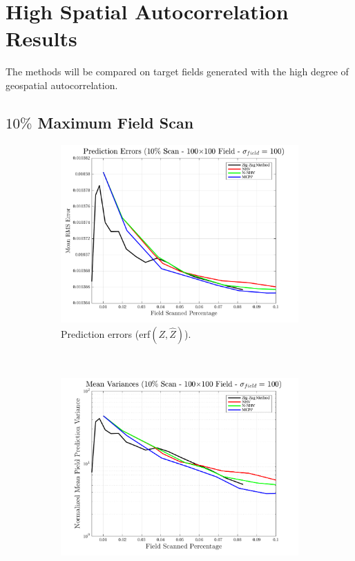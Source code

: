 \section{High Spatial Autocorrelation Results}
The methods will be compared on target fields generated with the high degree of geospatial autocorrelation.

\clearpage
\subsection{$10\%$ Maximum Field Scan}
\begin{figure}[htb!]
    \centering
    \begin{subfigure}[t]{0.65\textwidth}
        \centering
        \includegraphics[width=\linewidth]{figures/hbresults/pred_errs_10p_100x100_sf_100_seed_2.png}
        \captionsetup{skip=0.20\baselineskip,size=footnotesize}
        \caption{Prediction errors (erf$(Z,\hat{Z})$).}
        \label{fig:prederrs_sigma100_p10_s2}
    \end{subfigure}%
    \\
    \begin{subfigure}[t]{0.65\textwidth}
        \centering
        \includegraphics[width=\linewidth]{figures/hbresults/vars_10p_100x100_sf_100_seed_2.png}

\end{subfigure}
\end{figure}
